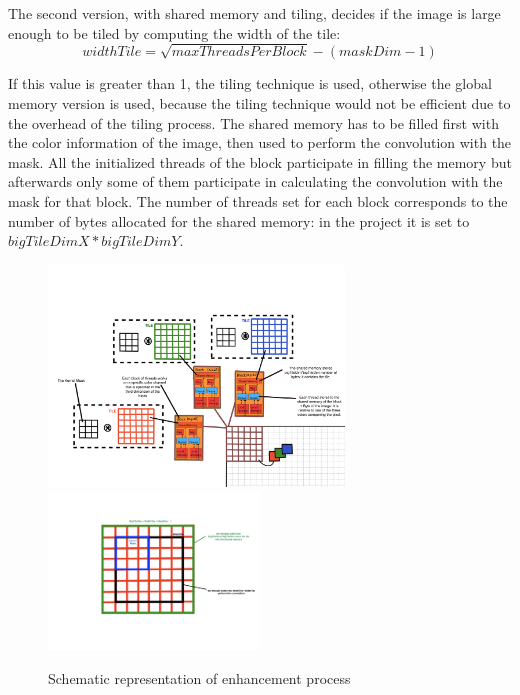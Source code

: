 
    The second version, with shared memory and tiling, decides if the image is large enough to be tiled by computing the width of the tile:
    \begin{equation}
        widthTile = \sqrt{maxThreadsPerBlock} - (maskDim - 1)
    \end{equation}
    
    \noindent If this value is greater than 1, the tiling technique is used, otherwise the global memory version is used, because the tiling technique would not be efficient
    due to the overhead of the tiling process.
    The shared memory has to be filled first with the color information of the image, then used to perform the convolution with the mask.
    All the initialized threads of the block participate in filling the memory but afterwards only some of them participate in calculating the convolution with the mask for that block.
    The number of threads set for each block corresponds to the number of bytes allocated for the shared memory: in the project it is set to $bigTileDimX*bigTileDimY$.

    \begin{figure}
        \centering
        \includegraphics[width=0.7\textwidth]{img/scheme.png}
        \includegraphics[width=0.5\textwidth]{img/threadsscheme.png}
        \caption{Schematic representation of enhancement process}
        \label{fig:tiling}
    \end{figure}

